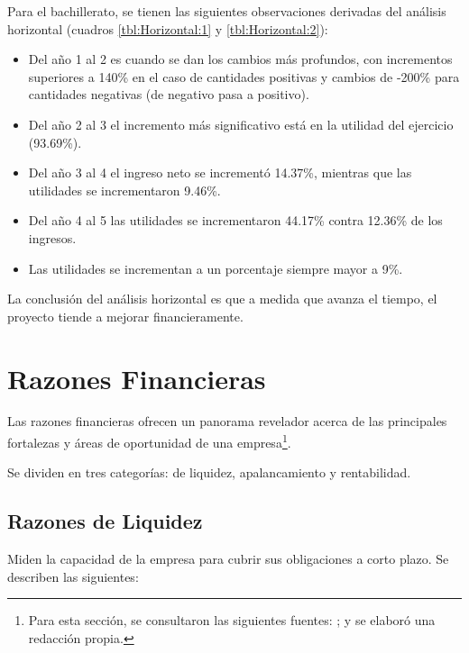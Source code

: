 Para el bachillerato, se tienen las siguientes observaciones derivadas del análisis horizontal (cuadros \ref{tbl:Horizontal:1} y \ref{tbl:Horizontal:2}):

\begin{itemize}
	\item Del año 1 al 2 es cuando se dan los cambios más profundos, con incrementos superiores a 140\% en el caso de cantidades positivas y cambios de -200\% para cantidades negativas (de negativo pasa a positivo).
	\item Del año 2 al 3 el incremento más significativo está en la utilidad del ejercicio (93.69\%).
	\item Del año 3 al 4 el ingreso neto se incrementó 14.37\%, mientras que las utilidades se incrementaron 9.46\%.
	\item Del año 4 al 5 las utilidades se incrementaron 44.17\% contra 12.36\% de los ingresos.
	\item Las utilidades se incrementan a un porcentaje siempre mayor a 9\%.
\end{itemize}

La conclusión del análisis horizontal es que a medida que avanza el tiempo, el proyecto tiende a mejorar financieramente.





\clearpage
\section{Razones Financieras}

Las razones financieras ofrecen un panorama revelador acerca de las principales fortalezas y áreas de oportunidad de una empresa\footnote{Para esta sección, se consultaron las siguientes fuentes: \citep{Brigham2005fundamentos, Gitman2003principios, Horngren2000introduccion, Moyer2004administracion, Van2003fundamentos}; y se elaboró una redacción propia.}.

Se dividen en tres categorías: de liquidez, apalancamiento y rentabilidad.



\subsection{Razones de Liquidez}

Miden la capacidad de la empresa para cubrir sus obligaciones a corto plazo. Se describen las siguientes:

